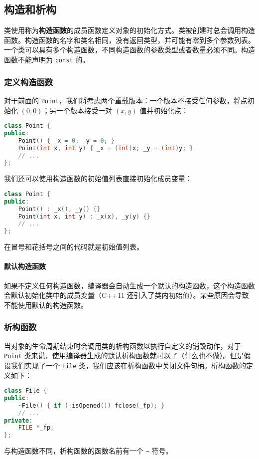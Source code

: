\documentclass[hyperref,UTF8]{article}
\begin{document}
\subsection{构造和析构} \label{sec:constructor}

类使用称为\textbf{构造函数}的成员函数定义对象的初始化方式。类被创建时总会调用构造函数。构造函数的名字和类名相同，没有返回类型，并可能有零到多个参数列表。一个类可以具有多个构造函数，不同构造函数的参数类型或者数量必须不同。构造函数不能声明为 \texttt{const} 的。

\subsubsection{定义构造函数}

对于前面的 \texttt{Point}，我们将考虑两个重载版本：一个版本不接受任何参数，将点初始化 $(0,0)$；另一个版本接受一对 $(x,y)$ 值并初始化点：
\begin{lstlisting}[language=c++]
class Point {
public:
    Point() { _x = 0; _y = 0; }
    Point(int x, int y) { _x = (int)x; _y = (int)y; }
    // ...
};
\end{lstlisting}
我们还可以使用构造函数的初始值列表直接初始化成员变量：
\begin{lstlisting}[language=c++]
class Point {
public:
    Point() : _x(), _y() {}
    Point(int x, int y) : _x(x), _y(y) {}
    // ...
};
\end{lstlisting}
在冒号和花括号之间的代码就是初始值列表。

\paragraph{默认构造函数} 如果不定义任何构造函数，编译器会自动生成一个默认的构造函数，这个构造函数会默认初始化类中的成员变量（C++11 还引入了类内初始值）。某些原因会导致不能使用默认的构造函数。

\subsubsection{析构函数}

当对象的生命周期结束时会调用类的析构函数以执行自定义的销毁动作，对于 \texttt{Point} 类来说，使用编译器生成的默认析构函数就可以了（什么也不做）。但是假设我们实现了一个 \texttt{File} 类，我们应该在析构函数中关闭文件句柄。析构函数的定义如下：
\begin{lstlisting}[language=c++]
class File {
public:
    ~File() { if (!isOpened()) fclose(_fp); }
    // ...
private:
    FILE *_fp;
};
\end{lstlisting}
与构造函数不同，析构函数的函数名前有一个 \texttt{\textasciitilde} 符号。
\end{document}
